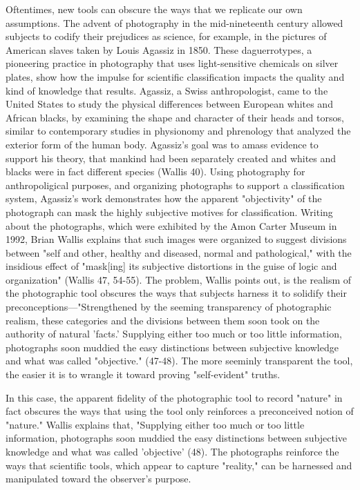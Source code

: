 \documentclass[11pt]{article}
\begin{document}
Oftentimes, new tools can obscure the ways that we replicate our own
assumptions. The advent of photography in the mid-nineteenth century
allowed subjects to codify their prejudices as science, for example,
in the pictures of American slaves taken by Louis Agassiz
in 1850. These daguerrotypes, a pioneering practice in photography
that uses light-sensitive chemicals on silver plates, show how the
impulse for scientific classification impacts the quality and kind of
knowledge that results. Agassiz, a Swiss anthropologist, came to the
United States to study the physical differences between European
whites and African blacks, by examining the shape and character of
their heads and torsos, similar to contemporary studies in physionomy
and phrenology that analyzed the exterior form of the human
body. Agassiz's goal was to amass evidence to support his theory, that
mankind had been separately created and whites and blacks were in fact
different species (Wallis 40). Using photography for anthropoligical
purposes, and organizing photographs to support a classification
system, Agassiz's work demonstrates how the apparent "objectivity" of
the photograph can mask the highly subjective motives for
classification. Writing about the photographs, which were exhibited by
the Amon Carter Museum in 1992, Brian Wallis explains that such images
were organized to suggest divisions between "self and other, healthy
and diseased, normal and pathological," with the insidious effect of
"mask[ing] its subjective distortions in the guise of logic and
organization" (Wallis 47, 54-55). The problem, Wallis points out, is
the realism of the photographic tool obscures the ways that subjects
harness it to solidify their preconceptions---"Strengthened by the
seeming transparency of photographic realism, these categories and the
divisions between them soon took on the authority of natural 'facts.'
Supplying either too much or too little information, photographs soon
muddied the easy distinctions between subjective knowledge and what
was called "objective." (47-48). The more seeminly transparent the
tool, the easier it is to wrangle it toward proving "self-evident"
truths.

In this case, the apparent fidelity of the photographic tool to record
"nature" in fact obscures the ways that using the tool only reinforces
a preconceived notion of "nature." Wallis explains that, "Supplying
either too much or too little information, photographs soon muddied
the easy distinctions between subjective knowledge and what was called
'objective' (48). The photographs reinforce the ways that scientific
tools, which appear to capture "reality," can be harnessed and
manipulated toward the observer's purpose.
\end{document}
